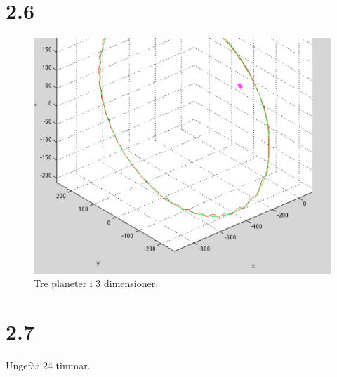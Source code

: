 \documentclass[a4paper,10pt]{article}
\begin{document}
    \section*{2.6}
    \begin{samepage}
    \end{samepage}
    \begin{samepage}
    \end{samepage}

    \begin{figure}
        \includegraphics[width=\textwidth]{celest33d.png}
        \caption{Tre planeter i 3 dimensioner.}
    \end{figure}

    \section*{2.7}
    Ungefär 24 timmar.
\end{document}
